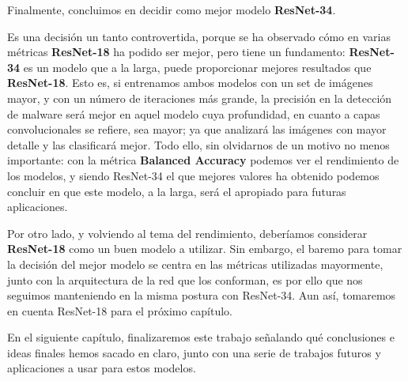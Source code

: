 Finalmente, concluimos en decidir como mejor modelo \textbf{ResNet-34}.

Es una decisión un tanto controvertida, porque se ha observado cómo en varias métricas \textbf{ResNet-18} ha podido ser mejor, pero tiene un fundamento: \textbf{ResNet-34} es un modelo que a la larga, puede proporcionar mejores resultados que \textbf{ResNet-18}. Esto es, si entrenamos ambos modelos con un set de imágenes mayor, y con un número de iteraciones más grande, la precisión en la detección de malware será mejor en aquel modelo cuya profundidad, en cuanto a capas convolucionales se refiere, sea mayor; ya que analizará las imágenes con mayor detalle y las clasificará mejor. Todo ello, sin olvidarnos de un motivo no menos importante: con la métrica \textbf{Balanced Accuracy} podemos ver el rendimiento de los modelos, y siendo ResNet-34 el que mejores valores ha obtenido podemos concluir en que este modelo, a la larga, será el apropiado para futuras aplicaciones.

Por otro lado, y volviendo al tema del rendimiento, deberíamos considerar \textbf{ResNet-18} como un buen modelo a utilizar. Sin embargo, el baremo para tomar la decisión del mejor modelo se centra en las métricas utilizadas mayormente, junto con la arquitectura de la red que los conforman, es por ello que nos seguimos manteniendo en la misma postura con ResNet-34. Aun así, tomaremos en cuenta ResNet-18 para el próximo capítulo.

En el siguiente capítulo, finalizaremos este trabajo señalando qué conclusiones e ideas finales hemos sacado en claro, junto con una serie de trabajos futuros y aplicaciones a usar para estos modelos.
